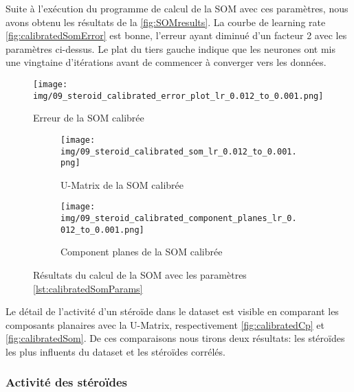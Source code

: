     Suite à l'exécution du programme de calcul de la SOM avec ces paramètres, nous avons obtenu les résultats de la \autoref{fig:SOMresults}. La courbe de learning rate \autoref{fig:calibratedSomError} est bonne, l'erreur ayant diminué d'un facteur 2 avec les paramètres ci-dessus. Le plat du tiers gauche indique que les neurones ont mis une vingtaine d'itérations avant de commencer à converger vers les données. 

    \begin{figure}[H]
        \centering
        \texttt{[image: img/09\_steroid\_calibrated\_error\_plot\_lr\_0.012\_to\_0.001.png]}    
        \caption{Erreur de la SOM calibrée}
        \label{fig:calibratedSomError}
    \end{figure}


    \begin{figure}[H]
        \begin{subfigure}[b]{0.6\textwidth}
            \centering
            \texttt{[image: img/09\_steroid\_calibrated\_som\_lr\_0.012\_to\_0.001.png]}
            \caption{U-Matrix de la SOM calibrée}
            \label{fig:calibratedSom}
        \end{subfigure}
        \begin{subfigure}[b]{0.4\textwidth}
            \centering
            \texttt{[image: img/09\_steroid\_calibrated\_component\_planes\_lr\_0.012\_to\_0.001.png]}    
            \caption{Component planes de la SOM calibrée}
            \label{fig:calibratedCp}
        \end{subfigure}
        \caption{Résultats du calcul de la SOM avec les paramètres \autoref{lst:calibratedSomParams}}
        \label{fig:SOMresults}
    \end{figure}

    Le détail de l'activité d'un stéroïde dans le dataset est visible en comparant les composants planaires avec la U-Matrix, respectivement \autoref{fig:calibratedCp} et \autoref{fig:calibratedSom}. De ces comparaisons nous tirons deux résultats: les stéroïdes les plus influents du dataset et les stéroïdes corrélés.

\subsubsection*{Activité des stéroïdes}


